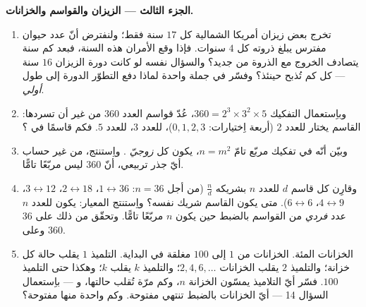 \begin{problem}
\medskip
\noindent\textbf{الجزء الثالث --- الزيزان والقواسم والخزانات.}
\begin{enumerate}[resume]
  \item تخرج بعض زيزان أمريكا الشمالية كل $17$ سنة فقط؛ ولنفترض
        أنّ عدد حيوان مفترس يبلغ ذروته كل $4$ سنوات. فإذا وقع
        الأمران هذه السنة، فبعد كم سنة يتصادف الخروج مع الذروة
        من جديد؟ والسؤال نفسه لو كانت دورة الزيزان $16$ سنة ---
        كل كم تُذبح حينئذ؟ وفسّر في جملة واحدة لماذا دفع التطوّر
        الدورة إلى طول \emph{أولي}.
  \item وباِستعمال التفكيك $360 = 2^3 \times 3^2 \times 5$، عُدّ
        قواسم العدد $360$ من غير أن تسردها: القاسم يختار
         للعدد $2$ (أربعة اِختيارات: $0, 1, 2, 3$)،
         للعدد $3$،  للعدد $5$. فكم قاسمًا في
        ؟
  \item وبيّن أنّه في تفكيك مربّع تامّ $n = m^2$، يكون كل  \emph{زوجيّ} . واِستنتج، من غير حساب
        أيّ جذر تربيعي، أنّ $360$ ليس مربّعًا تامًّا.
  \item وقارِن كل قاسم $d$ للعدد $n$ بشريكه $\frac{n}{d}$ (من
        أجل $n = 36$: $1 \leftrightarrow 36$، $2 \leftrightarrow 18$،
        $3 \leftrightarrow 12$، $4 \leftrightarrow 9$،
        $6 \leftrightarrow 6$). متى يكون القاسم شريك نفسه؟
        واِستنتج المعيار: يكون للعدد $n$ عدد \emph{فردي} من
        القواسم بالضبط حين يكون $n$ مربّعًا تامًّا. وتحقّق من
        ذلك على $36$ وعلى $360$.
  \item الخزانات المئة. الخزانات من $1$ إلى $100$ مغلقة في
        البداية. التلميذ $1$ يقلب حالة كل خزانة؛ والتلميذ $2$
        يقلب الخزانات $2, 4, 6, \dots$؛ والتلميذ $k$ يقلب
         $k$؛ وهكذا حتى التلميذ $100$. فسّر أيّ
        التلاميذ يمسّون الخزانة $n$، وكم مرّة تُقلب حالتها،
        و --- باِستعمال السؤال 14 --- أيّ الخزانات بالضبط تنتهي
        مفتوحة. وكم واحدة منها مفتوحة؟
\end{enumerate}
\end{problem}
